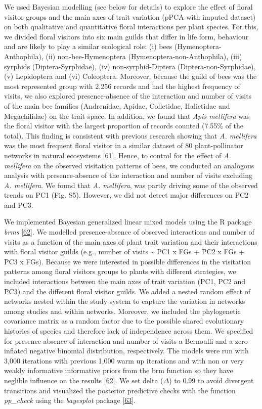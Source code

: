\documentclass[
  12pt,
  a4paper,
]{article}
\begin{document}
We used Bayesian modelling (see below for details) to explore the effect of floral visitor groups and the main axes of trait variation (pPCA with imputed dataset) on both qualitative and quantitative floral interactions per plant species. For this, we divided floral visitors into six main guilds that differ in life form, behaviour and are likely to play a similar ecological role: (i) bees (Hymenoptera-Anthophila), (ii) non-bee-Hymenoptera (Hymenoptera-non-Anthophila), (iii) syrphids (Diptera-Syrphidae), (iv) non-syrphid-Diptera (Diptera-non-Syrphidae), (v) Lepidoptera and (vi) Coleoptera. Moreover, because the guild of bees was the most represented group with 2,256 records and had the highest frequency of visits, we also explored presence-absence of the interaction and number of visits of the main bee families (Andrenidae, Apidae, Colletidae, Halictidae and Megachilidae) on the trait space. In addition, we found that \emph{Apis mellifera} was the floral visitor with the largest proportion of records counted (7.55\% of the total). This finding is consistent with previous research showing that \emph{A. mellifera} was the most frequent floral visitor in a similar dataset of 80 plant-pollinator networks in natural ecosystems {[}\protect\hyperlink{ref-hung2018}{61}{]}. Hence, to control for the effect of \emph{A. mellifera} on the observed visitation patterns of bees, we conducted an analogous analysis with presence-absence of the interaction and number of visits excluding \emph{A. mellifera}. We found that \emph{A. mellifera}, was partly driving some of the observed trends on PC1 (Fig. S5). However, we did not detect major differences on PC2 and PC3.

We implemented Bayesian generalized linear mixed models using the R package \emph{brms} {[}\protect\hyperlink{ref-burkner2017}{62}{]}. We modelled presence-absence of observed interactions and number of visits as a function of the main axes of plant trait variation and their interactions with floral visitor guilds (e.g., number of visits \textasciitilde{} PC1 x FGs + PC2 x FGs + PC3 x FGs). Because we were interested in possible differences in the visitation patterns among floral visitors groups to plants with different strategies, we included interactions between the main axes of trait variation (PC1, PC2 and PC3) and the different floral visitor guilds. We added a nested random effect of networks nested within the study system to capture the variation in networks among studies and within networks. Moreover, we included the phylogenetic covariance matrix as a random factor due to the possible shared evolutionary histories of species and therefore lack of independence across them. We specified for presence-absence of interaction and number of visits a Bernoulli and a zero inflated negative binomial distribution, respectively. The models were run with 3,000 iterations with previous 1,000 warm up iterations and with non or very weakly informative informative priors from the brm function so they have neglible influence on the results {[}\protect\hyperlink{ref-burkner2017}{62}{]}. We set delta (\(\Delta\)) to 0.99 to avoid divergent transitions and visualized the posterior predictive checks with the function \emph{pp\_check} using the \emph{bayesplot} package {[}\protect\hyperlink{ref-gabry2019}{63}{]}.
\end{document}
